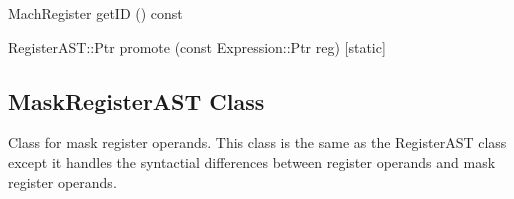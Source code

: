 \begin{apient}
  MachRegister getID () const
\end{apient}

\begin{apient}
  RegisterAST::Ptr promote (const Expression::Ptr reg) [static]
\end{apient}


\subsection{MaskRegisterAST Class}
\label{sec:MaskRegisterAST}

Class for mask register operands. This class is the same as the RegisterAST
class except it handles the syntactial differences between register operands
and mask register operands.
